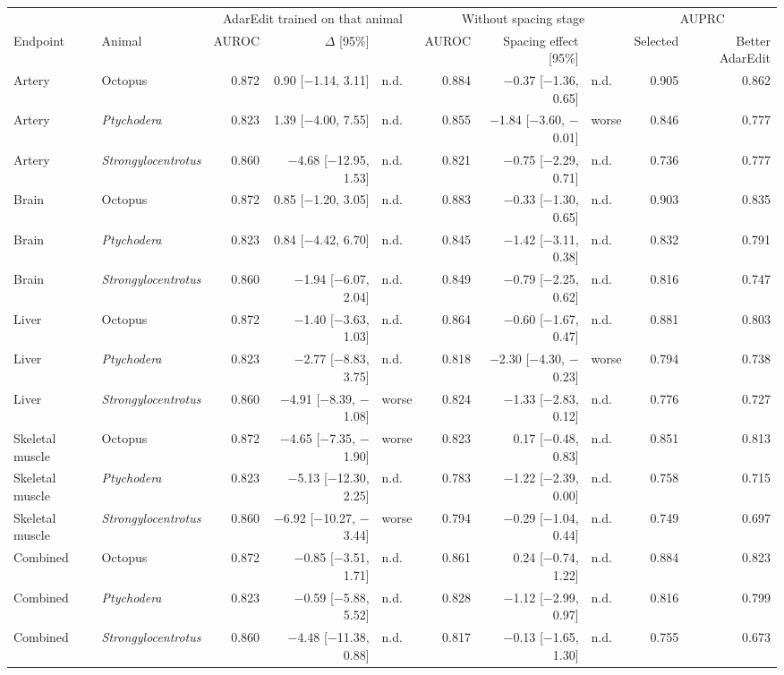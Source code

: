 \begin{table}[H]
\vspace{6pt}
\begin{tabular}{llrrlrrlrr}
\toprule
 & & \multicolumn{3}{c}{AdarEdit trained on that animal} & \multicolumn{3}{c}{Without spacing stage} & \multicolumn{2}{c}{AUPRC} \\
\cmidrule(lr){3-5}\cmidrule(lr){6-8}\cmidrule(lr){9-10}
Endpoint & Animal & AUROC & $\Delta$ [95\%] & & AUROC & Spacing effect [95\%] & & Selected & Better AdarEdit \\
\midrule
Artery & Octopus & 0.872 & 0.90 [$-$1.14, 3.11] & n.d. & 0.884 & $-$0.37 [$-$1.36, 0.65] & n.d. & 0.905 & 0.862 \\
Artery & \textit{Ptychodera} & 0.823 & 1.39 [$-$4.00, 7.55] & n.d. & 0.855 & $-$1.84 [$-$3.60, $-$0.01] & worse & 0.846 & 0.777 \\
Artery & \textit{Strongylocentrotus} & 0.860 & $-$4.68 [$-$12.95, 1.53] & n.d. & 0.821 & $-$0.75 [$-$2.29, 0.71] & n.d. & 0.736 & 0.777 \\
Brain & Octopus & 0.872 & 0.85 [$-$1.20, 3.05] & n.d. & 0.883 & $-$0.33 [$-$1.30, 0.65] & n.d. & 0.903 & 0.835 \\
Brain & \textit{Ptychodera} & 0.823 & 0.84 [$-$4.42, 6.70] & n.d. & 0.845 & $-$1.42 [$-$3.11, 0.38] & n.d. & 0.832 & 0.791 \\
Brain & \textit{Strongylocentrotus} & 0.860 & $-$1.94 [$-$6.07, 2.04] & n.d. & 0.849 & $-$0.79 [$-$2.25, 0.62] & n.d. & 0.816 & 0.747 \\
Liver & Octopus & 0.872 & $-$1.40 [$-$3.63, 1.03] & n.d. & 0.864 & $-$0.60 [$-$1.67, 0.47] & n.d. & 0.881 & 0.803 \\
Liver & \textit{Ptychodera} & 0.823 & $-$2.77 [$-$8.83, 3.75] & n.d. & 0.818 & $-$2.30 [$-$4.30, $-$0.23] & worse & 0.794 & 0.738 \\
Liver & \textit{Strongylocentrotus} & 0.860 & $-$4.91 [$-$8.39, $-$1.08] & worse & 0.824 & $-$1.33 [$-$2.83, 0.12] & n.d. & 0.776 & 0.727 \\
Skeletal muscle & Octopus & 0.872 & $-$4.65 [$-$7.35, $-$1.90] & worse & 0.823 & 0.17 [$-$0.48, 0.83] & n.d. & 0.851 & 0.813 \\
Skeletal muscle & \textit{Ptychodera} & 0.823 & $-$5.13 [$-$12.30, 2.25] & n.d. & 0.783 & $-$1.22 [$-$2.39, 0.00] & n.d. & 0.758 & 0.715 \\
Skeletal muscle & \textit{Strongylocentrotus} & 0.860 & $-$6.92 [$-$10.27, $-$3.44] & worse & 0.794 & $-$0.29 [$-$1.04, 0.44] & n.d. & 0.749 & 0.697 \\
Combined & Octopus & 0.872 & $-$0.85 [$-$3.51, 1.71] & n.d. & 0.861 & 0.24 [$-$0.74, 1.22] & n.d. & 0.884 & 0.823 \\
Combined & \textit{Ptychodera} & 0.823 & $-$0.59 [$-$5.88, 5.52] & n.d. & 0.828 & $-$1.12 [$-$2.99, 0.97] & n.d. & 0.816 & 0.799 \\
Combined & \textit{Strongylocentrotus} & 0.860 & $-$4.48 [$-$11.38, 0.88] & n.d. & 0.817 & $-$0.13 [$-$1.65, 1.30] & n.d. & 0.755 & 0.673 \\
\bottomrule
\end{tabular}
\end{table}
